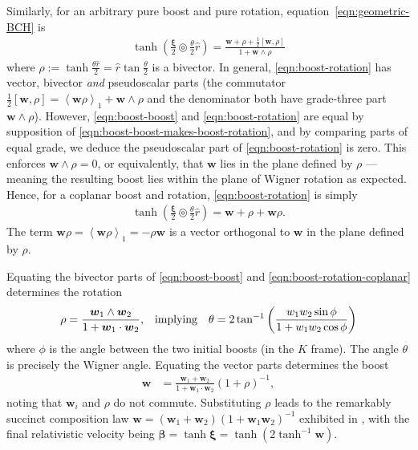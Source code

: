 \documentclass[12pt,a4paper]{article}
\renewcommand{\vb}[1]{\boldsymbol{#1}}
\newcommand{\grade}[2][]{\left\langle#2\right\rangle_{#1}}
\newcommand{\bch}[2]{#1 \circledcirc #2}
\begin{document}
Similarly, for an arbitrary pure boost and pure rotation, equation~\eqref{eqn:geometric-BCH} is
\begin{align}
	\tanh(\bch{\frac{\vb \xi{}}2}{\frac\theta2\hat{r}})
	= \frac{\vb{w}{} + \rho{} + \frac12[\vb{w}{}, \rho{}]}{1 + \vb{w}{}\wedge \rho{}}
	\label{eqn:boost-rotation}
\end{align}
where $\rho{} :={} \tanh \frac{\theta\hat{r}}2 = \hat{r}\tan\frac \theta2$ is a bivector.
In general, \eqref{eqn:boost-rotation} has vector, bivector \emph{and} pseudoscalar parts (the commutator $\frac12[\vb{w}{}, \rho{}] = \grade[1]{\vb{w}{}\rho{}} + \vb{w}{} \wedge \rho{}$ and the denominator both have grade-three part $\vb{w}{}\wedge \rho{}$).
However, \eqref{eqn:boost-boost} and \eqref{eqn:boost-rotation} are equal by supposition of \eqref{eqn:boost-boost-makes-boost-rotation}, and by comparing parts of equal grade, we deduce the pseudoscalar part of \eqref{eqn:boost-rotation} is zero.
This enforces $\vb{w}{}\wedge \rho{} = 0$, or equivalently, that $\vb{w}{}$ lies in the plane defined by $\rho{}$ --- meaning the resulting boost lies within the plane of Wigner rotation as expected.
Hence, for a coplanar boost and rotation, \eqref{eqn:boost-rotation} is simply
\begin{align}
	\tanh(\bch{\frac{\vb \xi{}}2}{\frac\theta2\hat{r}})
	= \vb{w}{} + \rho{} + \vb{w}{}\rho{}
	\label{eqn:boost-rotation-coplanar}
.\end{align}
The term $\vb{w}{}\rho{} = \grade[1]{\vb{w}{}\rho{}} = -\rho{}\vb{w}{}$ is a vector orthogonal to $\vb{w}{}$ in the plane defined by $\rho{}$.

Equating the bivector parts of \eqref{eqn:boost-boost} and \eqref{eqn:boost-rotation-coplanar} determines the rotation
\begin{align}
	\rho{} &= \frac{\vb{w}{}_1 \wedge \vb{w}{}_2}{1 + \vb{w}{}_1 \cdot{} \vb{w}{}_2}
,&	&\text{implying}
&	\theta = 2\tan^{-1}\qty(\frac{w_1w_2\sin\phi{}}{1 + w_1w_2\cos\phi{}})
\end{align}
where $\phi{}$ is the angle between the two initial boosts (in the $K$ frame).
The angle $\theta$ is precisely the Wigner angle.
Equating the vector parts determines the boost
\begin{align}
	\vb{w}{} &= \frac{\vb{w}{}_1 + \vb{w}{}_2}{1 + \vb{w}{}_1\cdot{}\vb{w}{}_2}(1 + \rho{})^{-1}
,\end{align}
noting that $\vb{w}{}_i$ and $\rho{}$ do not commute.
Substituting $\rho{}$ leads to the remarkably succinct composition law
\begin{math}
	\vb{w}{} = (\vb{w}{}_1 + \vb{w}{}_2)(1 + \vb{w}{}_1\vb{w}{}_2)^{-1}
\end{math}
exhibited in \cite{berry2020quat-sr}, with the final relativistic velocity being $\vb \beta{} = \tanh \vb \xi{} = \tanh (2\tanh^{-1} \vb{w}{})$.
\end{document}
